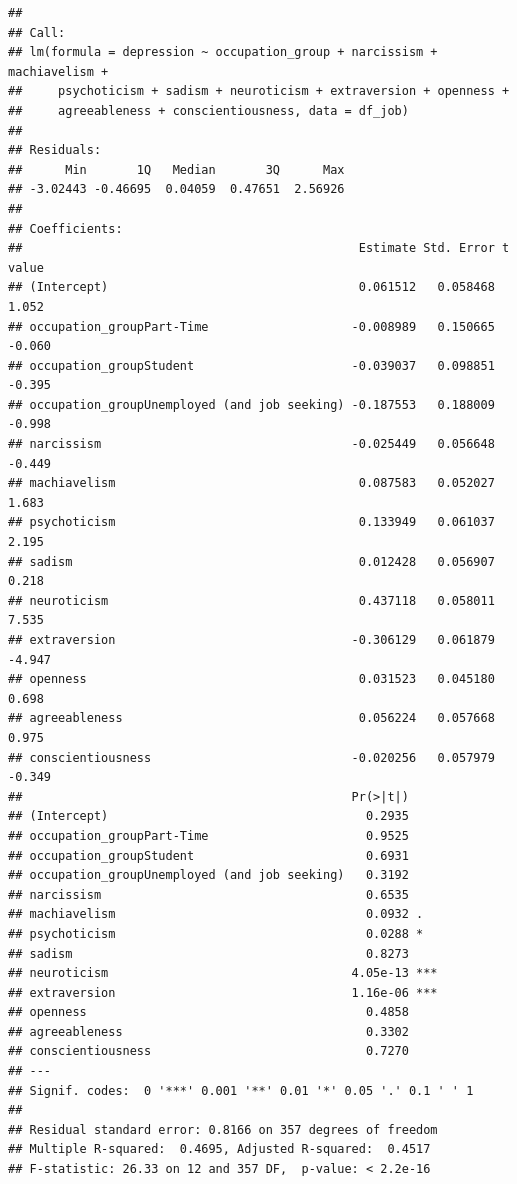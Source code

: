 \documentclass[
]{article}
\begin{document}
\begin{verbatim}
## 
## Call:
## lm(formula = depression ~ occupation_group + narcissism + machiavelism + 
##     psychoticism + sadism + neuroticism + extraversion + openness + 
##     agreeableness + conscientiousness, data = df_job)
## 
## Residuals:
##      Min       1Q   Median       3Q      Max 
## -3.02443 -0.46695  0.04059  0.47651  2.56926 
## 
## Coefficients:
##                                               Estimate Std. Error t value
## (Intercept)                                   0.061512   0.058468   1.052
## occupation_groupPart-Time                    -0.008989   0.150665  -0.060
## occupation_groupStudent                      -0.039037   0.098851  -0.395
## occupation_groupUnemployed (and job seeking) -0.187553   0.188009  -0.998
## narcissism                                   -0.025449   0.056648  -0.449
## machiavelism                                  0.087583   0.052027   1.683
## psychoticism                                  0.133949   0.061037   2.195
## sadism                                        0.012428   0.056907   0.218
## neuroticism                                   0.437118   0.058011   7.535
## extraversion                                 -0.306129   0.061879  -4.947
## openness                                      0.031523   0.045180   0.698
## agreeableness                                 0.056224   0.057668   0.975
## conscientiousness                            -0.020256   0.057979  -0.349
##                                              Pr(>|t|)    
## (Intercept)                                    0.2935    
## occupation_groupPart-Time                      0.9525    
## occupation_groupStudent                        0.6931    
## occupation_groupUnemployed (and job seeking)   0.3192    
## narcissism                                     0.6535    
## machiavelism                                   0.0932 .  
## psychoticism                                   0.0288 *  
## sadism                                         0.8273    
## neuroticism                                  4.05e-13 ***
## extraversion                                 1.16e-06 ***
## openness                                       0.4858    
## agreeableness                                  0.3302    
## conscientiousness                              0.7270    
## ---
## Signif. codes:  0 '***' 0.001 '**' 0.01 '*' 0.05 '.' 0.1 ' ' 1
## 
## Residual standard error: 0.8166 on 357 degrees of freedom
## Multiple R-squared:  0.4695, Adjusted R-squared:  0.4517 
## F-statistic: 26.33 on 12 and 357 DF,  p-value: < 2.2e-16
\end{verbatim}
\end{document}
